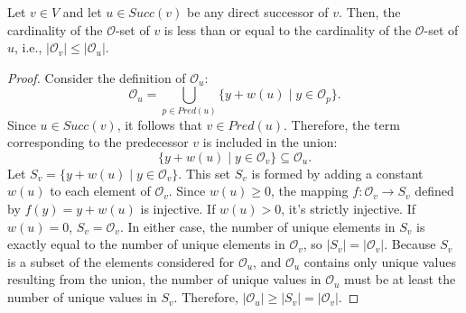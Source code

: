 \begin{lemma}
    \label{lem:o_set_cardinality_monotonicity}
    Let $v \in V$ and let $u \in Succ(v)$ be any direct successor of $v$. Then, the cardinality of the $\mathcal{O}$-set of $v$ is less than or equal to the cardinality of the $\mathcal{O}$-set of $u$, i.e., $|\mathcal{O}_v| \le |\mathcal{O}_u|$.
\end{lemma}
\begin{proof}
    Consider the definition of $\mathcal{O}_u$:
    \[ \mathcal{O}_u = \bigcup_{p \in Pred(u)} \{ y + w(u) \mid y \in \mathcal{O}_p \}. \]
    Since $u \in Succ(v)$, it follows that $v \in Pred(u)$. Therefore, the term corresponding to the predecessor $v$ is included in the union:
    \[ \{ y + w(u) \mid y \in \mathcal{O}_v \} \subseteq \mathcal{O}_u. \]
    Let $S_v = \{ y + w(u) \mid y \in \mathcal{O}_v \}$. This set $S_v$ is formed by adding a constant $w(u)$ to each element of $\mathcal{O}_v$. Since $w(u) \ge 0$, the mapping $f: \mathcal{O}_v \to S_v$ defined by $f(y) = y + w(u)$ is injective. If $w(u)>0$, it's strictly injective. If $w(u)=0$, $S_v=\mathcal{O}_v$. In either case, the number of unique elements in $S_v$ is exactly equal to the number of unique elements in $\mathcal{O}_v$, so $|S_v| = |\mathcal{O}_v|$.
    Because $S_v$ is a subset of the elements considered for $\mathcal{O}_u$, and $\mathcal{O}_u$ contains only unique values resulting from the union, the number of unique values in $\mathcal{O}_u$ must be at least the number of unique values in $S_v$.
    Therefore, $|\mathcal{O}_u| \ge |S_v| = |\mathcal{O}_v|$.
\end{proof}

